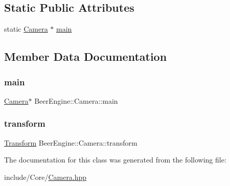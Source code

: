 \subsection*{Static Public Attributes}
\begin{DoxyCompactItemize}
\item 
static \mbox{\hyperlink{class_beer_engine_1_1_camera}{Camera}} $\ast$ \mbox{\hyperlink{class_beer_engine_1_1_camera_aca558a665afcf487dc66e7deb5edba58}{main}}
\end{DoxyCompactItemize}


\subsection{Member Data Documentation}
\mbox{\label{class_beer_engine_1_1_camera_aca558a665afcf487dc66e7deb5edba58}} 
\subsubsection{\texorpdfstring{main}{main}}
{\footnotesize\ttfamily \mbox{\hyperlink{class_beer_engine_1_1_camera}{Camera}}$\ast$ Beer\+Engine\+::\+Camera\+::main\hspace{0.3cm}{\ttfamily [static]}}

\mbox{\label{class_beer_engine_1_1_camera_a4bbec6c322e5f260eca34a98d2eaeb93}} 
\subsubsection{\texorpdfstring{transform}{transform}}
{\footnotesize\ttfamily \mbox{\hyperlink{class_beer_engine_1_1_transform}{Transform}} Beer\+Engine\+::\+Camera\+::transform}



The documentation for this class was generated from the following file\+:\begin{DoxyCompactItemize}
\item 
include/\+Core/\mbox{\hyperlink{_camera_8hpp}{Camera.\+hpp}}\end{DoxyCompactItemize}
